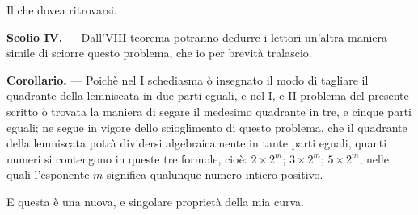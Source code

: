 \documentclass{article}
\begin{document}
Il che dovea ritrovarsi.

\textbf{Scolio IV.} --- Dall'VIII teorema potranno dedurre i lettori un'altra maniera simile di
sciorre questo problema, che io per brevità tralascio.

\textbf{Corollario.} --- Poichè nel I schediasma ò insegnato il modo di tagliare il quadrante
della lemniscata in due parti eguali, e nel I, e II problema del presente scritto ò trovata la
maniera di segare il medesimo quadrante in tre, e cinque parti eguali; ne segue in vigore dello
scioglimento di questo problema, che il quadrante della lemniscata potrà dividersi
algebraicamente in tante parti eguali, quanti numeri si contengono in queste tre formole, cioè:
$2 \times 2^{m}$; $3 \times 2^{m}$; $5 \times 2^{m}$, nelle quali l'esponente $m$ significa
qualunque numero intiero positivo.

E questa è una nuova, e singolare proprietà della mia curva.
\end{document}
